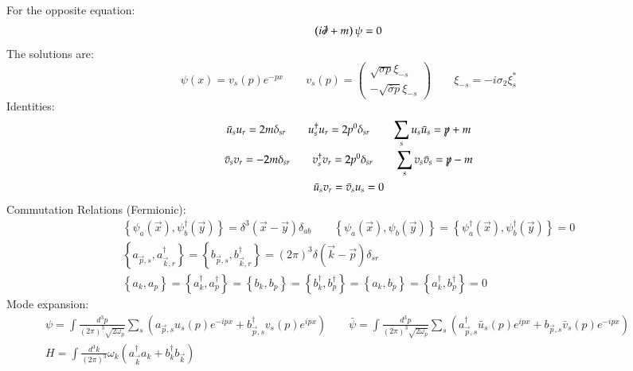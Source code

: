 \documentclass{article}
\begin{document}
For the opposite equation:
\begin{equation*}
    \left(i\slashed{\partial} + m\right)\psi = 0
\end{equation*}
The solutions are:
\begin{equation*}
    \psi(x) = v_s(p) e^{-px}
    \qquad
    v_s(p) = \begin{pmatrix}
        \sqrt{\sigma p} \xi_{-s} \\ -\sqrt{\bar{\sigma} p} \xi_{-s}
    \end{pmatrix}
    \qquad
    \xi_{-s} = -i\sigma_2\xi_s^*
\end{equation*}
Identities:
\begin{equation*}
\begin{gathered}
    \bar{u}_s u_r = 2m\delta_{sr}
    \qquad
    u_s^\dagger u_r = 2p^0\delta_{sr}
    \qquad
    \sum_s u_s \bar{u}_s = \slashed{p} + m
    \\
    \bar{v}_s v_r = -2m\delta_{sr}
    \qquad
    v_s^\dagger v_r = 2p^0\delta_{sr}
    \qquad
    \sum_s v_s \bar{v}_s = \slashed{p} - m
    \\
    \bar{u}_s v_r = \bar{v}_s u_s = 0
\end{gathered}
\end{equation*}
Commutation Relations (Fermionic):
\begin{equation*}
\begin{gathered}
    \left\{\psi_a(\vec{x}), \psi_b^\dagger(\vec{y})\right\} = \delta^3(\vec{x} - \vec{y})\delta_{ab}
    \qquad
    \left\{\psi_a(\vec{x}), \psi_b(\vec{y})\right\} =
    \left\{\psi_a^\dagger(\vec{x}), \psi_b^\dagger(\vec{y})\right\} =
    0
    \\
    \left\{a_{\vec{p}, s}, a_{\vec{k}, r}^\dagger\right\} = \left\{b_{\vec{p}, s}, b_{\vec{k}, r}^\dagger\right\} = (2\pi)^3\delta(\vec{k} - \vec{p})\delta_{sr}
    \\
    \left\{a_k, a_p\right\} = \left\{a_k^\dagger, a_p^\dagger\right\} = \left\{b_k, b_p\right\} = \left\{b_k^\dagger, b_p^\dagger\right\} = \left\{a_k, b_p\right\} = \left\{a_k^\dagger, b_p^\dagger\right\} = 0
\end{gathered}
\end{equation*}
Mode expansion:
\begin{equation*}
\begin{gathered}
    \psi = \int \frac{d^3p}{(2\pi)^3\sqrt{2\omega_p}}
    \sum_s
    \left(
        a_{\vec{p}, s} u_s(p) e^{-ipx} + b_{\vec{p}, s}^\dagger v_s(p) e^{ipx}
    \right)
    \qquad
    \bar{\psi} = \int \frac{d^3p}{(2\pi)^3\sqrt{2\omega_p}}
    \sum_s
    \left(
        a_{\vec{p}, s}^\dagger \bar{u}_s(p) e^{ipx} + b_{\vec{p}, s} \bar{v}_s(p) e^{-ipx}
    \right)
    \qquad
    \\
    H = \int \frac{d^3k}{(2\pi)^3} \omega_k \left(
        a_{\vec{k}}^\dagger a_{k} + b_{k}^\dagger b_{\vec{k}}
    \right)
\end{gathered}
\end{equation*}
\end{document}
